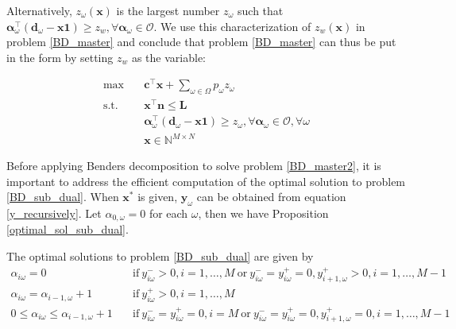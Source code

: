 Alternatively, $z_{\omega}(\mathbf{x})$ is the largest number $z_{\omega}$ such that $\bm{\alpha}_{\omega}^{\intercal}(\mathbf{d}_{\omega}- \mathbf{x} \mathbf{1}) \geq z_w, \forall \bm{\alpha}_{\omega} \in \mathcal{O}$. We use this characterization of $z_w(\mathbf{x})$ in problem \eqref{BD_master} and conclude that problem \eqref{BD_master} can thus be put in the form by setting $z_w$ as the variable:

\begin{equation}\label{BD_master2}
  \begin{aligned}
    \max \quad & \mathbf{c}^{\intercal} \mathbf{x} + \sum_{\omega \in \Omega} p_{\omega} z_{\omega} \\
    \text {s.t.} \quad & \mathbf{x}^{\intercal} \mathbf{n}  \leq \mathbf{L} \\
    & \bm{\alpha}_{\omega}^{\intercal}(\mathbf{d}_{\omega}- \mathbf{x} \mathbf{1}) \geq z_{\omega}, \forall \bm{\alpha}_{\omega} \in \mathcal{O}, \forall \omega \\
     & \mathbf{x} \in \mathbb{N}^{M \times N}
  \end{aligned}
\end{equation}


Before applying Benders decomposition to solve problem \eqref{BD_master2}, it is important to address the efficient computation of the optimal solution to problem \eqref{BD_sub_dual}. When $\mathbf{x}^{*}$ is given, $\mathbf{y}_{\omega}$ can be obtained from equation \eqref{y_recursively}. Let $\alpha_{0, \omega} = 0$ for each $\omega$, then we have Proposition \ref{optimal_sol_sub_dual}.

\begin{prop}\label{optimal_sol_sub_dual}
  The optimal solutions to problem \eqref{BD_sub_dual} are given by 
\begin{equation}\label{BD_sub_simplified}
  \begin{aligned}
    \alpha_{i \omega} = 0 \quad & \text{if}~  y_{i \omega}^{-} > 0,  i =1,\ldots, M~\text{or}~ y_{i \omega}^{-} = y_{i \omega}^{+} = 0, y_{i+1, \omega}^{+}> 0, i = 1,\ldots, M-1 \\
    \alpha_{i \omega} = \alpha_{i-1, \omega}+1 \quad & \text{if}~ y_{i \omega}^{+} > 0, i =1,\ldots, M \\
    0 \leq \alpha_{i \omega} \leq \alpha_{i-1, \omega}+1 \quad & \text{if}~ y_{i \omega}^{-} = y_{i \omega}^{+} = 0, i = M~\text{or}~ y_{i \omega}^{-} = y_{i \omega}^{+} = 0, y_{i+1, \omega}^{+}= 0, i = 1,\ldots, M-1
  \end{aligned}
\end{equation}
\end{prop}



